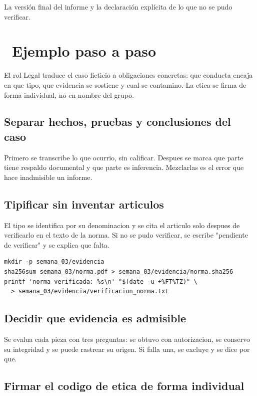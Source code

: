 \documentclass[11pt,a4paper]{article}
\newcommand{\iconotexto}[2]{\textcolor{cyanNeon}{\faIcon{#1}}~#2}
\begin{document}
La versión final del informe y la declaración explícita de lo que no se pudo verificar.

\section{\iconotexto{list-ol}{Ejemplo paso a paso}}

El rol Legal traduce el caso ficticio a obligaciones concretas: que conducta encaja en que tipo, que evidencia se sostiene y cual se contamino. La etica se firma de forma individual, no en nombre del grupo.

\subsection{Separar hechos, pruebas y conclusiones del caso}

Primero se transcribe lo que ocurrio, sin calificar. Despues se marca que parte tiene respaldo documental y que parte es inferencia. Mezclarlas es el error que hace inadmisible un informe.

\subsection{Tipificar sin inventar articulos}

El tipo se identifica por su denominacion y se cita el articulo solo despues de verificarlo en el texto de la norma. Si no se pudo verificar, se escribe "pendiente de verificar" y se explica que falta.

\begin{lstlisting}[style=estiloCodigo]
mkdir -p semana_03/evidencia
sha256sum semana_03/norma.pdf > semana_03/evidencia/norma.sha256
printf 'norma verificada: %s\n' "$(date -u +%FT%TZ)" \
  > semana_03/evidencia/verificacion_norma.txt
\end{lstlisting}

\subsection{Decidir que evidencia es admisible}

Se evalua cada pieza con tres preguntas: se obtuvo con autorizacion, se conservo su integridad y se puede rastrear su origen. Si falla una, se excluye y se dice por que.

\subsection{Firmar el codigo de etica de forma individual}
\end{document}
